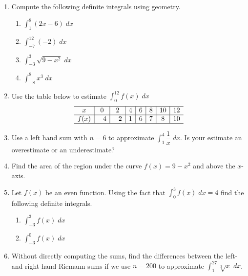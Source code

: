 \documentclass[11pt]{article}
\newcommand{\ds}{\displaystyle}
\begin{document}
\drawtitle

\begin{enumerate}
\item Compute the following definite integrals using geometry.
  \begin{enumerate}
  \item $\ds\int_1^8 (2x-6)\;dx$
    \vfill
  \item $\ds\int_{-7}^{12} (-2)\;dx$
    \vfill
    \newpage
  \item $\ds\int_{-3}^3 \sqrt{9-x^2}\;dx$
    \vfill
  \item $\ds\int_{-8}^8 x^3\;dx$
    \vfill
  \end{enumerate}

  \newpage

\item Use the table below to estimate $\ds\int_0^{12} f(x)\;dx$
  \[
  \begin{array}{c|c|c|c|c|c|c|c}
    \hline
    x&0&2&4&6&8&10&12\\
    \hline
    f(x)&-4&-2&1&6&7&8&10\\
    \hline
  \end{array}
  \]

  \newpage

\item Use a left hand sum with $n=6$ to approximate
  $\ds\int_1^4\dfrac{1}{x}\;dx$.  Is your estimate an overestimate or
  an underestimate?

  \vfill

\item Find the area of the region under the curve $f(x)=9-x^2$ and
  above the $x$-axis.

  \vfill

  \newpage

\item Let $f(x)$ be an even function.  Using the fact that
  $\ds\int_0^3 f(x)\;dx = 4$ find the following definite integrals.
  \begin{enumerate}
  \item $\ds\int_{-3}^3 f(x)\;dx$
    \vfill
  \item $\ds\int_{-3}^0 f(x)\;dx$
    \vfill
  \end{enumerate}

  \newpage

\item Without directly computing the sums, find the differences between
  the left- and right-hand Riemann sums if we use $n=200$ to
  approximate $\ds\int_1^{27}\sqrt[3]{x}\;dx$.

  
\end{enumerate}
\end{document}
